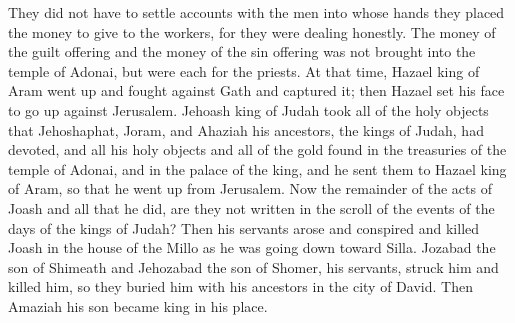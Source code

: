 \begin{biblechapter}
\verse They did not have to settle accounts with the men into whose hands they placed the money to give to the workers, for they were dealing honestly.
\verse The money of the guilt offering and the money of the sin offering was not brought into the temple of Adonai, but were each for the priests.
 At that time, Hazael king of Aram went up and fought against Gath and captured it; then Hazael set his face to go up against Jerusalem.
\verse Jehoash king of Judah took all of the holy objects that Jehoshaphat, Joram, and Ahaziah his ancestors, the kings of Judah, had devoted, and all his holy objects and all of the gold found in the treasuries of the temple of Adonai, and in the palace of the king, and he sent them to Hazael king of Aram, so that he went up from Jerusalem.
\verse Now the remainder of the acts of Joash and all that he did, are they not written in the scroll of the events of the days of the kings of Judah?
\verse Then his servants arose and conspired and killed Joash in the house of the Millo as he was going down toward Silla.
\verse Jozabad the son of Shimeath and Jehozabad the son of Shomer, his servants, struck him and killed him, so they buried him with his ancestors in the city of David. Then Amaziah his son became king in his place.
\end{biblechapter}

